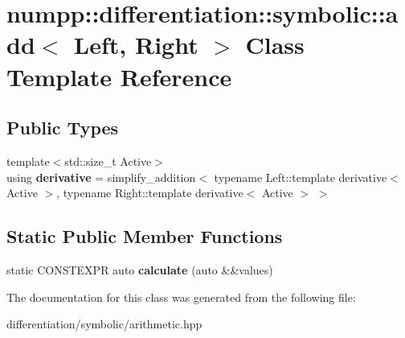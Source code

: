 \hypertarget{classnumpp_1_1differentiation_1_1symbolic_1_1add}{}\section{numpp\+:\+:differentiation\+:\+:symbolic\+:\+:add$<$ Left, Right $>$ Class Template Reference}
\label{classnumpp_1_1differentiation_1_1symbolic_1_1add}
\subsection*{Public Types}
\begin{DoxyCompactItemize}
\item 
\mbox{\label{classnumpp_1_1differentiation_1_1symbolic_1_1add_ac35c48851cc9973a588118e0124a3923}} 
{\footnotesize template$<$std\+::size\+\_\+t Active$>$ }\\using {\bfseries derivative} = simplify\+\_\+addition$<$ typename Left\+::template derivative$<$ Active $>$, typename Right\+::template derivative$<$ Active $>$ $>$
\end{DoxyCompactItemize}
\subsection*{Static Public Member Functions}
\begin{DoxyCompactItemize}
\item 
\mbox{\label{classnumpp_1_1differentiation_1_1symbolic_1_1add_a659d6caff200d26ca21e8edd636a1273}} 
static C\+O\+N\+S\+T\+E\+X\+PR auto {\bfseries calculate} (auto \&\&values)
\end{DoxyCompactItemize}


The documentation for this class was generated from the following file\+:\begin{DoxyCompactItemize}
\item 
differentiation/symbolic/arithmetic.\+hpp\end{DoxyCompactItemize}
